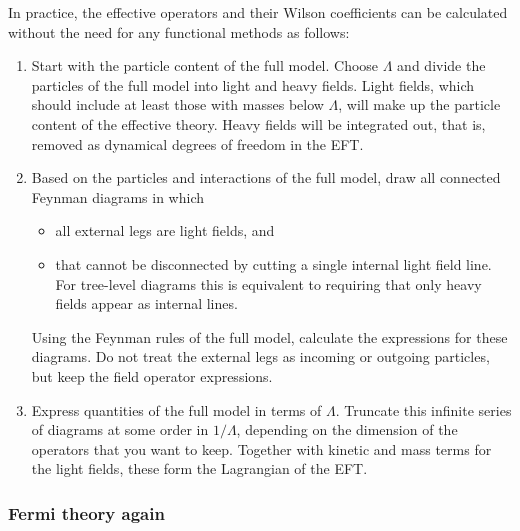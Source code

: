 In practice, the effective operators and their Wilson coefficients can
be calculated without the need for any functional methods as follows:
%
\begin{enumerate}
\item Start with the particle content of the full model. Choose
  $\Lambda$ and divide the particles of the full model into light and
  heavy fields. Light fields, which should include at least those with
  masses below $\Lambda$, will make up the particle content of the
  effective theory. Heavy fields will be integrated out, that
  is, removed as dynamical degrees of freedom in the EFT.
%
\item Based on the particles and interactions of the full model, draw
  all connected Feynman diagrams in which
%
  \begin{itemize}
    \item all external legs are light fields, and
    \item that cannot be disconnected by cutting a single internal
      light field line. For tree-level diagrams this is equivalent to
      requiring that only heavy fields appear as internal lines.
  \end{itemize}
%
  Using the Feynman rules of the full model, calculate the expressions
  for these diagrams. Do not treat the external legs as incoming or
  outgoing particles, but keep the field operator expressions.
%
\item Express quantities of the full model in terms of
  $\Lambda$. Truncate this infinite series of diagrams at some order
  in $1/\Lambda$, depending on the dimension of the operators that you
  want to keep. Together with kinetic and mass terms for the light
  fields, these form the Lagrangian of the EFT.
\end{enumerate}



  
\subsubsection{Fermi theory again}


